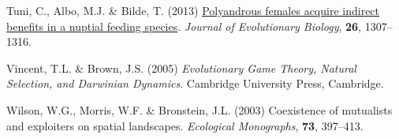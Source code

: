 \documentclass[
]{article}
\newlength{\cslhangindent}
\newlength{\cslentryspacingunit} %
\newenvironment{CSLReferences}[2] %
 {%
  \setlength{\parindent}{0pt}
  \ifodd #1
  \let\oldpar\par
  \def\par{\hangindent=\cslhangindent\oldpar}
  \fi
  \setlength{\parskip}{#2\cslentryspacingunit}
 }%
 {}
\begin{document}
\begin{CSLReferences}{0}{0}
\leavevmode{}%
Tuni, C., Albo, M.J. \& Bilde, T. (2013)
\href{https://doi.org/10.1111/jeb.12137}{{Polyandrous females acquire
indirect benefits in a nuptial feeding species}}. \emph{Journal of
Evolutionary Biology}, \textbf{26}, 1307--1316.

\leavevmode{}%
Vincent, T.L. \& Brown, J.S. (2005) \emph{{Evolutionary Game Theory,
Natural Selection, and Darwinian Dynamics}}. Cambridge University Press,
Cambridge.

\leavevmode{}%
Wilson, W.G., Morris, W.F. \& Bronstein, J.L. (2003) {Coexistence of
mutualists and exploiters on spatial landscapes}. \emph{Ecological
Monographs}, \textbf{73}, 397--413.

\end{CSLReferences}
\end{document}
